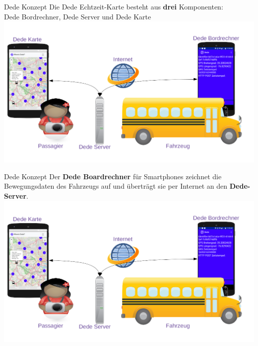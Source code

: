 
\begin{frame}{Dede Konzept}
  Die Dede Echtzeit-Karte besteht aus \textbf{drei} Komponenten:\\
  Dede Bordrechner, Dede Server und Dede Karte
  \includegraphics[width=\paperwidth]{dede/dede-concept}
\end{frame}

\begin{frame}{Dede Konzept}
  Der \textbf{Dede Boardrechner} für Smartphones zeichnet die Bewegungsdaten des Fahrzeugs auf und überträgt sie per Internet an den \textbf{Dede-Server}.
  \includegraphics[width=\paperwidth]{dede/dede-concept}
\end{frame}

